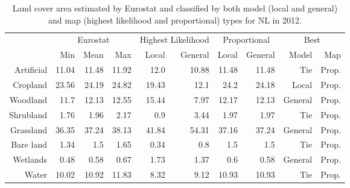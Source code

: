     \begin{table}[H]
    \centering
    \caption{Land cover area estimated by Eurostat and classified by both model (local and general) and map (highest likelihood and proportional) types for NL in 2012.}
    
    \begin{tabular}{r|rrr|rr|rr|rr}
    \toprule
    {} & \multicolumn{3}{|c}{Eurostat} & \multicolumn{2}{|c}{Highest Likelihood} & \multicolumn{2}{|c}{Proportional} & \multicolumn{2}{|c}{Best} \\
    {} &      Min &   Mean &    Max &              Local & General &        Local & General &    Model &    Map \\
    \midrule
    Artificial &    11.04 &  11.48 &  11.92 &               12.0 &   10.88 &        11.48 &   11.48 &      Tie &  Prop. \\
    Cropland   &    23.56 &  24.19 &  24.82 &              19.43 &    12.1 &         24.2 &   24.18 &    Local &  Prop. \\
    Woodland   &     11.7 &  12.13 &  12.55 &              15.44 &    7.97 &        12.17 &   12.13 &  General &  Prop. \\
    Shrubland  &     1.76 &   1.96 &   2.17 &                0.9 &    3.44 &         1.97 &    1.97 &      Tie &  Prop. \\
    Grassland  &    36.35 &  37.24 &  38.13 &              41.84 &   54.31 &        37.16 &   37.24 &  General &  Prop. \\
    Bare land  &     1.34 &    1.5 &   1.65 &               0.34 &     0.8 &          1.5 &     1.5 &      Tie &  Prop. \\
    Wetlands   &     0.48 &   0.58 &   0.67 &               1.73 &    1.37 &          0.6 &    0.58 &  General &  Prop. \\
    Water      &    10.02 &  10.92 &  11.83 &               8.32 &    9.12 &        10.93 &   10.93 &      Tie &  Prop. \\
    \bottomrule
    \end{tabular}
    \end{table}
    
